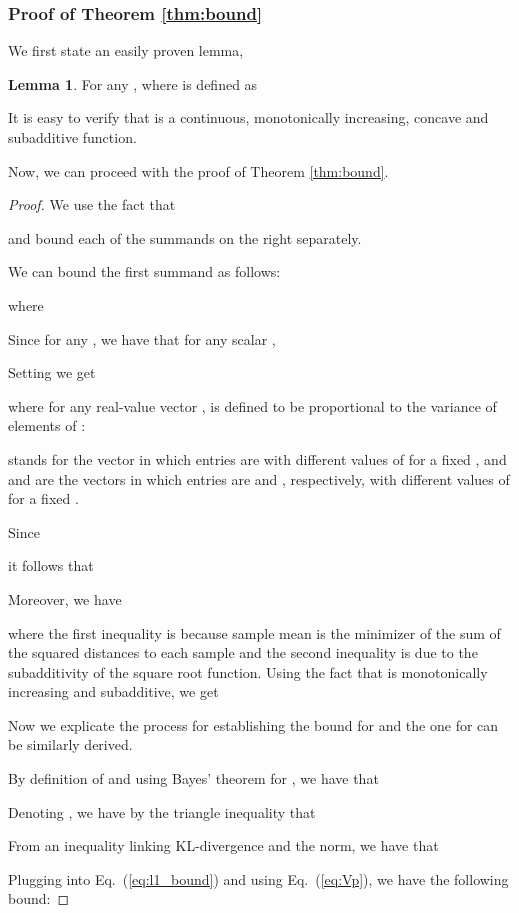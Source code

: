 \documentclass{article} \usepackage{iclr2021_conference,times}
\theoremstyle{definition}
\newtheorem{lemma}[theorem]{Lemma}
\theoremstyle{remark}
\newcommand{\modified}[1]{{\color{black}{#1}}}
\begin{document}
\subsubsection{Proof of Theorem \ref{thm:bound}}
We first state an easily proven lemma,

\begin{lemma} \label{lem:phi} For any ,  
where  is defined as

\end{lemma}

It is easy to verify that  is a continuous, monotonically increasing, concave and subadditive function.

Now, we can proceed with the proof of Theorem \ref{thm:bound}.

\begin{proof}
We use the fact that 

and bound each of the summands on the right separately.

We can bound the first summand as follows: 

where 


Since  for any , we have that for any scalar ,


Setting  we get

where for any real-value vector ,  is defined to be proportional to the variance of elements of :

 stands for the vector in which entries are  with different values of  for a fixed , and  and  are the vectors in which entries are  and , respectively, with different values of  for a fixed .

Since 

it follows that 


Moreover, we have 

where the ﬁrst inequality is because sample mean is the minimizer of the sum of the squared distances to each sample and the second inequality is due to the subadditivity of the square root function.
Using the fact that  is monotonically increasing and subadditive, we get


Now we explicate the process for establishing the bound for  and the one for  can be similarly derived.

By deﬁnition of  and using Bayes' theorem  for , we have that


Denoting , we have by the triangle inequality that 

From an inequality linking KL-divergence and the  norm, we have that 

Plugging \modified{Eq.~(\ref{eq:l1_bound2})} into Eq.~(\ref{eq:l1_bound}) and using Eq.~(\ref{eq:Vp}), we have the following bound: 


\end{proof}
\end{document}

